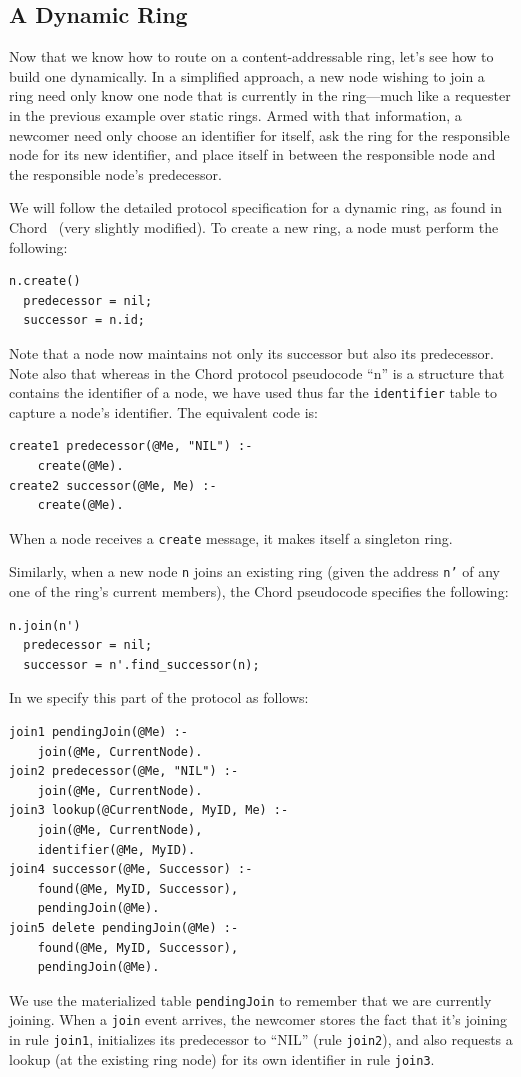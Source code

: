 \documentclass{article}
\begin{document}
\subsection{A Dynamic Ring}
\label{sec:dynamicRing}
Now that we know how to route on a content-addressable ring, let's see
how to build one dynamically.  In a simplified approach, a new node
wishing to join a ring need only know one node that is currently in the
ring---much like a requester in the previous example over static
rings.  Armed with that information, a newcomer need only choose an
identifier for itself, ask the ring for the responsible node for its new
identifier, and place itself in between the responsible node and the
responsible node's predecessor.

We will follow the detailed protocol specification for a dynamic ring,
as found in Chord~\cite{Stoica2003} (very slightly modified). To create a new ring, a node must
perform the following:
\begin{verbatim}
n.create()
  predecessor = nil;
  successor = n.id;
\end{verbatim}
Note that a node now maintains not only its successor but also its
predecessor. Note also that whereas in the Chord protocol pseudocode
``n'' is a structure that contains the identifier of a node, we have
used thus far the \lstinline$identifier$ table to capture a node's
identifier.  The equivalent \ol code is:
\begin{lstlisting}
create1 predecessor(@Me, "NIL") :-
	create(@Me).
create2 successor(@Me, Me) :-
	create(@Me).
\end{lstlisting}
When a node receives a \lstinline$create$ message, it makes itself a
singleton ring.

Similarly, when a new node \texttt{n} joins an existing ring (given the
address \texttt{n'} of any one of the ring's current members), the Chord pseudocode
specifies the following:
\begin{verbatim}
n.join(n')
  predecessor = nil;
  successor = n'.find_successor(n);
\end{verbatim}
In \ol we specify this part of the protocol as follows:
\begin{lstlisting}
join1 pendingJoin(@Me) :-
	join(@Me, CurrentNode).
join2 predecessor(@Me, "NIL") :-
	join(@Me, CurrentNode).
join3 lookup(@CurrentNode, MyID, Me) :-
	join(@Me, CurrentNode),
	identifier(@Me, MyID).
join4 successor(@Me, Successor) :-
	found(@Me, MyID, Successor),
	pendingJoin(@Me).
join5 delete pendingJoin(@Me) :-
	found(@Me, MyID, Successor),
	pendingJoin(@Me).
\end{lstlisting}
We use the materialized table \lstinline$pendingJoin$ to remember that
we are currently joining.  When a \lstinline$join$ event arrives, the
newcomer stores the fact that it's joining in rule \lstinline$join1$,
initializes its predecessor to ``NIL'' (rule \lstinline$join2$), and
also requests a lookup (at the existing ring node) for its own
identifier in rule \lstinline$join3$.
\end{document}
